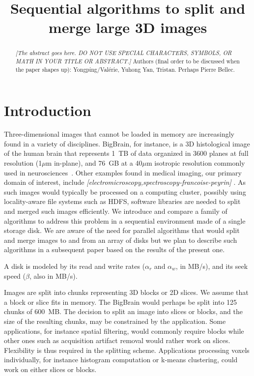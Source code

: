 \documentclass[10pt, conference, compsocconf]{IEEEtran}
\newcommand{\todo}[1]{
  \color{red}\emph{[#1]}
  \color{black}
}
\begin{document}
\title{Sequential algorithms to split and merge large 3D images}

\maketitle

\begin{abstract}
  \todo{The abstract goes here. DO NOT USE SPECIAL CHARACTERS,
    SYMBOLS, OR MATH IN YOUR TITLE OR ABSTRACT.}  Authors (final order
  to be discussed when the paper shapes up): Yongping/Val\'erie,
  Yuhong Yan, Tristan. Perhaps Pierre Bellec.
\end{abstract}


\section{Introduction}

Three-dimensional images that cannot be loaded in memory are
increasingly found in a variety of disciplines. BigBrain, for
instance, is a 3D histological image of the human brain that
represents 1~TB of data organized in 3600 planes at full resolution
(1$\mu$m in-plane), and 76~GB at a 40$\mu$m isotropic resolution
commonly used in neurosciences~\cite{amunts2013bigbrain}. Other
examples found in medical imaging, our primary domain of interest,
include \todo{electromicroscopy,spectroscopy-francoise-peyrin}. As
such images would typically be processed on a computing cluster,
possibly using locality-aware file systems such as HDFS, software
libraries are needed to split and merged such images efficiently. We
introduce and compare a family of algorithms to address this problem
in a sequential environment made of a single storage disk. We are
aware of the need for parallel algorithms that would split and merge
images to and from an array of disks but we plan to describe such
algorithms in a subsequent paper based on the results of the present
one.

A disk is modeled by its read and write rates ($\alpha_r$ and
$\alpha_w$, in MB/s), and its seek speed ($\beta$, also in
MB/s).

Images are split into chunks representing 3D blocks or 2D slices. We
assume that a block or slice fits in memory. The BigBrain would
perhaps be split into 125 chunks of 600~MB. The decision to split an
image into slices or blocks, and the size of the resulting chunks, may
be constrained by the application. Some applications, for instance
spatial filtering, would commonly require blocks while other ones such
as acquisition artifact removal would rather work on
slices. Flexibility is thus required in the splitting
scheme. Applications processing voxels individually, for instance
histogram computation or k-means clustering, could work on either
slices or blocks.
\end{document}
